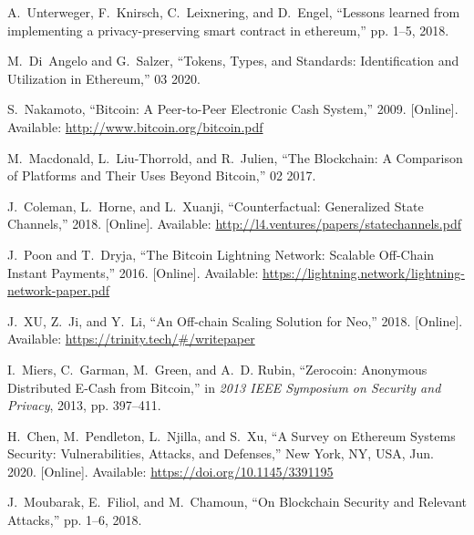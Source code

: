 \documentclass[conference]{IEEEtran}
\begin{document}
\begin{thebibliography}{10}
A.~{Unterweger}, F.~{Knirsch}, C.~{Leixnering}, and D.~{Engel}, ``Lessons
  learned from implementing a privacy-preserving smart contract in ethereum,''
  pp. 1--5, 2018.

M.~Di~Angelo and G.~Salzer, ``Tokens, Types, and Standards: Identification and
  Utilization in Ethereum,'' 03 2020.

\BIBentryALTinterwordspacing
S.~Nakamoto, ``{Bitcoin: A Peer-to-Peer Electronic Cash System},'' 2009.
  [Online]. Available: \url{http://www.bitcoin.org/bitcoin.pdf}
\BIBentrySTDinterwordspacing

M.~Macdonald, L.~Liu-Thorrold, and R.~Julien, ``{The Blockchain: A Comparison
  of Platforms and Their Uses Beyond Bitcoin},'' 02 2017.

\BIBentryALTinterwordspacing
J.~Coleman, L.~Horne, and L.~Xuanji, ``{Counterfactual: Generalized State
  Channels},'' 2018. [Online]. Available:
  \url{http://l4.ventures/papers/statechannels.pdf}
\BIBentrySTDinterwordspacing

\BIBentryALTinterwordspacing
J.~Poon and T.~Dryja, ``{The Bitcoin Lightning Network: Scalable Off-Chain
  Instant Payments},'' 2016. [Online]. Available:
  \url{https://lightning.network/lightning-network-paper.pdf}
\BIBentrySTDinterwordspacing

\BIBentryALTinterwordspacing
J.~XU, Z.~Ji, and Y.~Li, ``{An Off-chain Scaling Solution for Neo},'' 2018.
  [Online]. Available: \url{https://trinity.tech/#/writepaper}
\BIBentrySTDinterwordspacing

I.~Miers, C.~Garman, M.~Green, and A.~D. Rubin, ``{Zerocoin: Anonymous
  Distributed E-Cash from Bitcoin},'' in \emph{2013 IEEE Symposium on Security
  and Privacy}, 2013, pp. 397--411.

\BIBentryALTinterwordspacing
H.~Chen, M.~Pendleton, L.~Njilla, and S.~Xu, ``A Survey on Ethereum Systems
  Security: Vulnerabilities, Attacks, and Defenses,'' New York, NY, USA, Jun.
  2020. [Online]. Available: \url{https://doi.org/10.1145/3391195}
\BIBentrySTDinterwordspacing

J.~{Moubarak}, E.~{Filiol}, and M.~{Chamoun}, ``{On Blockchain Security and
  Relevant Attacks},'' pp. 1--6, 2018.

\end{thebibliography}
\end{document}
